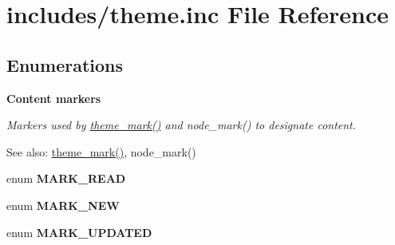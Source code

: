 \hypertarget{includes_2theme_8inc}{
\section{includes/theme.inc File Reference}
\label{includes_2theme_8inc}
}
\subsection*{Enumerations}
\begin{Indent}{\bf Content markers}\par
{\em Markers used by \hyperlink{group__themeable_gf27d1fe596ce8f28199ca2bed5b9816d}{theme\_\-mark()} and node\_\-mark() to designate content. \begin{Desc}
\item[See also:]\hyperlink{group__themeable_gf27d1fe596ce8f28199ca2bed5b9816d}{theme\_\-mark()}, node\_\-mark() \end{Desc}
}\begin{CompactItemize}
\item 
enum \textbf{MARK\_\-READ} 
\item 
enum \textbf{MARK\_\-NEW} 
\item 
enum \textbf{MARK\_\-UPDATED} 
\end{CompactItemize}
\end{Indent}
